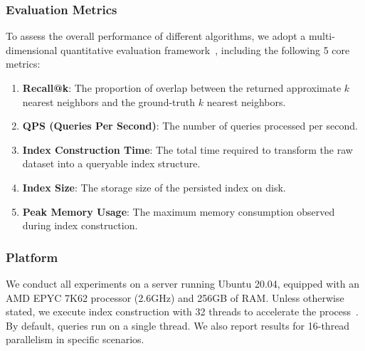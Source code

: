 \documentclass[sigconf, nonacm]{acmart}
\begin{document}
	
	
	
	
	
	\subsubsection{Evaluation Metrics}
	
	To assess the overall performance of different algorithms, we adopt a multi-dimensional quantitative evaluation framework~\cite{compare}, including the following 5 core metrics:
	
	\begin{enumerate}
		
		\item \textbf{Recall@k}: The proportion of overlap between the returned approximate $k$ nearest neighbors and the ground-truth $k$ nearest neighbors.
		\item \textbf{QPS (Queries Per Second)}: The number of queries processed per second.
		\item \textbf{Index Construction Time}: The total time required to transform the raw dataset into a queryable index structure.
		\item \textbf{Index Size}: The storage size of the persisted index on disk.
		\item \textbf{Peak Memory Usage}: The maximum memory consumption observed during index construction.
	\end{enumerate}
	
	
	
	
	
	\subsubsection{Platform}
	
	
	We conduct all experiments on a server running Ubuntu 20.04, equipped with an AMD EPYC 7K62 processor (2.6GHz) and 256GB of RAM. Unless otherwise stated, we execute index construction with 32 threads to accelerate the process~\cite{benchmarkindex}. By default, queries run on a single thread. We also report results for 16-thread parallelism in specific scenarios.
	
\end{document}
